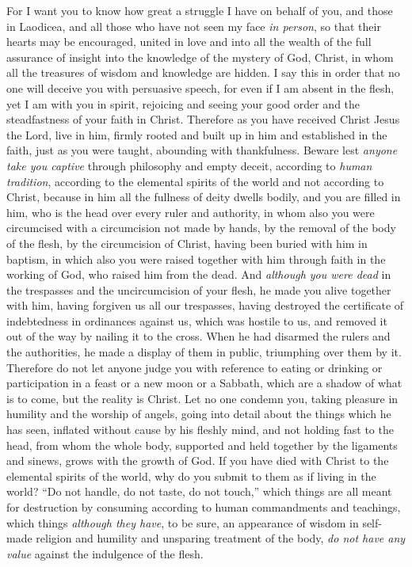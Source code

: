 \begin{biblechapter} %
 For I want you to know how great a struggle I have on behalf of you, and those in Laodicea, and all those who have not seen my face \textit{in person},
\verse so that their hearts may be encouraged, united in love and into all the wealth of the full assurance of insight into the knowledge of the mystery of God, Christ,
\verse in whom all the treasures of wisdom and knowledge are hidden.
\verse I say this in order that no one will deceive you with persuasive speech,
\verse for even if I am absent in the flesh, yet I am with you in spirit, rejoicing and seeing your good order and the steadfastness of your faith in Christ.
 Therefore as you have received Christ Jesus the Lord, live in him,
\verse firmly rooted and built up in him and established in the faith, just as you were taught, abounding with thankfulness.
\verse Beware lest \textit{anyone take you captive} through philosophy and empty deceit, according to \textit{human tradition}, according to the elemental spirits of the world and not according to Christ,
\verse because in him all the fullness of deity dwells bodily,
\verse and you are filled in him, who is the head over every ruler and authority,
\verse in whom also you were circumcised with a circumcision not made by hands, by the removal of the body of the flesh, by the circumcision of Christ,
\verse having been buried with him in baptism, in which also you were raised together with him through faith in the working of God, who raised him from the dead.
\verse And \textit{although you were dead} in the trespasses and the uncircumcision of your flesh, he made you alive together with him, having forgiven us all our trespasses,
\verse having destroyed the certificate of indebtedness in ordinances against us, which was hostile to us, and removed it out of the way by nailing it to the cross.
\verse When he had disarmed the rulers and the authorities, he made a display of them in public, triumphing over them by it.
 Therefore do not let anyone judge you with reference to eating or drinking or participation in a feast or a new moon or a Sabbath,
\verse which are a shadow of what is to come, but the reality is Christ.
\verse Let no one condemn you, taking pleasure in humility and the worship of angels, going into detail about the things which he has seen, inflated without cause by his fleshly mind,
\verse and not holding fast to the head, from whom the whole body, supported and held together by the ligaments and sinews, grows with the growth of God.
\verse If you have died with Christ to the elemental spirits of the world, why do you submit to them as if living in the world?
\verse “Do not handle, do not taste, do not touch,”
\verse which things are all meant for destruction by consuming according to human commandments and teachings,
\verse which things \textit{although they have}, to be sure, an appearance of wisdom in self-made religion and humility and unsparing treatment of the body, \textit{do not have any value} against the indulgence of the flesh.
\end{biblechapter}

